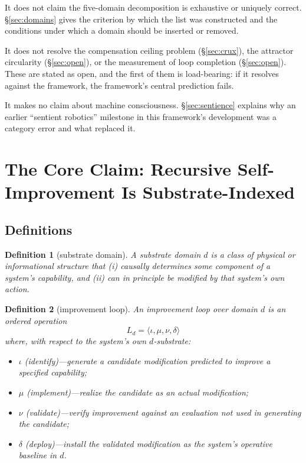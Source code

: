 \documentclass[11pt]{article}
\newtheorem{definition}{Definition}
\begin{document}
It does not claim the five-domain decomposition is exhaustive or uniquely correct. \S\ref{sec:domains} gives the criterion by which the list was constructed and the conditions under which a domain should be inserted or removed.

It does not resolve the compensation ceiling problem (\S\ref{sec:crux}), the attractor circularity (\S\ref{sec:open}), or the measurement of loop completion (\S\ref{sec:open}). These are stated as open, and the first of them is load-bearing: if it resolves against the framework, the framework's central prediction fails.

It makes no claim about machine consciousness. \S\ref{sec:sentience} explains why an earlier ``sentient robotics'' milestone in this framework's development was a category error and what replaced it.

\section{The Core Claim: Recursive Self-Improvement Is Substrate-Indexed}
\label{sec:core}

\subsection{Definitions}

\begin{definition}[substrate domain]
A substrate domain $d$ is a class of physical or informational structure that (i) causally determines some component of a system's capability, and (ii) can in principle be modified by that system's own action.
\end{definition}

\begin{definition}[improvement loop]
An improvement loop over domain $d$ is an ordered operation
\[
L_d = \langle \iota, \mu, \nu, \delta \rangle
\]
where, with respect to the system's own $d$-substrate:
\begin{itemize}
\item $\iota$ (\emph{identify})---generate a candidate modification predicted to improve a specified capability;
\item $\mu$ (\emph{implement})---realize the candidate as an actual modification;
\item $\nu$ (\emph{validate})---verify improvement against an evaluation not used in generating the candidate;
\item $\delta$ (\emph{deploy})---install the validated modification as the system's operative baseline in $d$.
\end{itemize}
\end{definition}
\end{document}
